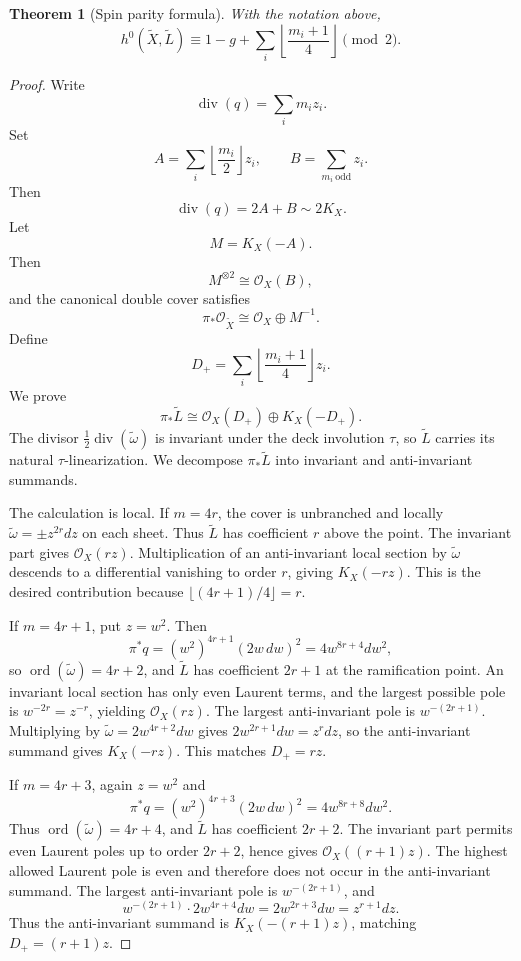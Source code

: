 \documentclass[11pt]{article}
\newtheorem{theorem}{Theorem}[section]
\theoremstyle{remark}
\newcommand{\Xt}{\widetilde X}
\newcommand{\Lt}{\widetilde L}
\newcommand{\wt}{\widetilde\omega}
\newcommand{\OO}{\mathcal O}
\DeclareMathOperator{\ord}{ord}
\DeclareMathOperator{\dv}{div}
\begin{document}
\begin{theorem}[Spin parity formula]\label{thm:spin}
With the notation above,
\[
h^0(\Xt,\Lt)\equiv 1-g+\sum_i\left\lfloor\frac{m_i+1}{4}\right\rfloor\pmod 2.
\]
\end{theorem}
\begin{proof}
Write
\[
\dv(q)=\sum_i m_i z_i.
\]
Set
\[
A=\sum_i\left\lfloor\frac{m_i}{2}\right\rfloor z_i,\qquad
B=\sum_{m_i\ \mathrm{odd}}z_i.
\]
Then
\[
\dv(q)=2A+B\sim 2K_X.
\]
Let
\[
M=K_X(-A).
\]
Then
\[
M^{\otimes 2}\cong\OO_X(B),
\]
and the canonical double cover satisfies
\[
\pi_*\OO_{\Xt}\cong\OO_X\oplus M^{-1}.
\]
Define
\[
D_+=\sum_i\left\lfloor\frac{m_i+1}{4}\right\rfloor z_i.
\]
We prove
\begin{equation}\label{eq:splitting}
\pi_*\Lt\cong\OO_X(D_+)\oplus K_X(-D_+).
\end{equation}
The divisor $\frac12\dv(\wt)$ is invariant under the deck involution $\tau$, so $\Lt$ carries its natural $\tau$-linearization.
We decompose $\pi_*\Lt$ into invariant and anti-invariant summands.

The calculation is local. If $m=4r$, the cover is unbranched and locally $\wt=\pm z^{2r}dz$ on each
sheet. Thus $\Lt$ has coefficient $r$ above the point. The invariant part gives $\OO_X(rz)$. Multiplication
of an anti-invariant local section by $\wt$ descends to a differential vanishing to order $r$, giving
$K_X(-rz)$. This is the desired contribution because $\lfloor(4r+1)/4\rfloor=r$.

If $m=4r+1$, put $z=w^2$. Then
\[
\pi^*q=(w^2)^{4r+1}(2w\,dw)^2=4w^{8r+4}dw^2,
\]
so $\ord(\wt)=4r+2$, and $\Lt$ has coefficient $2r+1$ at the ramification point. An invariant local section
has only even Laurent terms, and the largest possible pole is $w^{-2r}=z^{-r}$, yielding $\OO_X(rz)$. The
largest anti-invariant pole is $w^{-(2r+1)}$. Multiplying by $\wt=2w^{4r+2}dw$ gives $2w^{2r+1}dw=z^r dz$, so
the anti-invariant summand gives $K_X(-rz)$. This matches $D_+=rz$.

If $m=4r+3$, again $z=w^2$ and
\[
\pi^*q=(w^2)^{4r+3}(2w\,dw)^2=4w^{8r+8}dw^2.
\]
Thus $\ord(\wt)=4r+4$, and $\Lt$ has coefficient $2r+2$. The invariant part permits even Laurent
poles up to order $2r+2$, hence gives $\OO_X((r+1)z)$. The highest allowed Laurent pole is even
and therefore does not occur in the anti-invariant summand. The largest anti-invariant pole is
$w^{-(2r+1)}$, and
\[
w^{-(2r+1)}\cdot 2w^{4r+4}dw=2w^{2r+3}dw=z^{r+1}dz.
\]
Thus the anti-invariant summand is $K_X(-(r+1)z)$, matching $D_+=(r+1)z$.


\end{proof}
\end{document}
